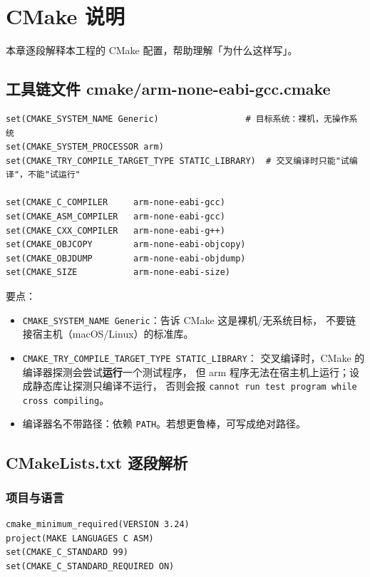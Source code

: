 \section{CMake 说明}

本章逐段解释本工程的 CMake 配置，帮助理解「为什么这样写」。

\subsection{工具链文件 cmake/arm-none-eabi-gcc.cmake}

\begin{lstlisting}[style=generic]
set(CMAKE_SYSTEM_NAME Generic)                 # 目标系统：裸机，无操作系统
set(CMAKE_SYSTEM_PROCESSOR arm)
set(CMAKE_TRY_COMPILE_TARGET_TYPE STATIC_LIBRARY)  # 交叉编译时只能"试编译"，不能"试运行"

set(CMAKE_C_COMPILER     arm-none-eabi-gcc)
set(CMAKE_ASM_COMPILER   arm-none-eabi-gcc)
set(CMAKE_CXX_COMPILER   arm-none-eabi-g++)
set(CMAKE_OBJCOPY        arm-none-eabi-objcopy)
set(CMAKE_OBJDUMP        arm-none-eabi-objdump)
set(CMAKE_SIZE           arm-none-eabi-size)
\end{lstlisting}

要点：

\begin{itemize}
  \item \texttt{CMAKE\_SYSTEM\_NAME Generic}：告诉 CMake 这是裸机/无系统目标，
        不要链接宿主机（macOS/Linux）的标准库。
  \item \texttt{CMAKE\_TRY\_COMPILE\_TARGET\_TYPE STATIC\_LIBRARY}：
        交叉编译时，CMake 的编译器探测会尝试\textbf{运行}一个测试程序，
        但 arm 程序无法在宿主机上运行；设成静态库让探测只编译不运行，
        否则会报 \texttt{cannot run test program while cross compiling}。
  \item 编译器名不带路径：依赖 \texttt{PATH}。若想更鲁棒，可写成绝对路径。
\end{itemize}

\subsection{CMakeLists.txt 逐段解析}

\subsubsection{项目与语言}

\begin{lstlisting}[style=generic]
cmake_minimum_required(VERSION 3.24)
project(MAKE LANGUAGES C ASM)
set(CMAKE_C_STANDARD 99)
set(CMAKE_C_STANDARD_REQUIRED ON)
\end{lstlisting}

